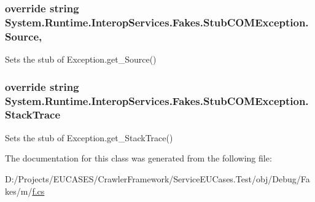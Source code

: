 \hypertarget{class_system_1_1_runtime_1_1_interop_services_1_1_fakes_1_1_stub_c_o_m_exception_a6d206a4389618e6d53ee52db095c06f0}{
\subsubsection[{Source}]{\setlength{\rightskip}{0pt plus 5cm}override string System.\-Runtime.\-Interop\-Services.\-Fakes.\-Stub\-C\-O\-M\-Exception.\-Source\hspace{0.3cm}{\ttfamily [get]}, {\ttfamily [set]}}}\label{class_system_1_1_runtime_1_1_interop_services_1_1_fakes_1_1_stub_c_o_m_exception_a6d206a4389618e6d53ee52db095c06f0}


Sets the stub of Exception.\-get\-\_\-\-Source()

\hypertarget{class_system_1_1_runtime_1_1_interop_services_1_1_fakes_1_1_stub_c_o_m_exception_a547d0dc6ad8e8085a304927a7ffe11d9}{
\subsubsection[{Stack\-Trace}]{\setlength{\rightskip}{0pt plus 5cm}override string System.\-Runtime.\-Interop\-Services.\-Fakes.\-Stub\-C\-O\-M\-Exception.\-Stack\-Trace\hspace{0.3cm}{\ttfamily [get]}}}\label{class_system_1_1_runtime_1_1_interop_services_1_1_fakes_1_1_stub_c_o_m_exception_a547d0dc6ad8e8085a304927a7ffe11d9}


Sets the stub of Exception.\-get\-\_\-\-Stack\-Trace()



The documentation for this class was generated from the following file\-:\begin{DoxyCompactItemize}
\item 
D\-:/\-Projects/\-E\-U\-C\-A\-S\-E\-S/\-Crawler\-Framework/\-Service\-E\-U\-Cases.\-Test/obj/\-Debug/\-Fakes/m/\hyperlink{m_2f_8cs}{f.\-cs}\end{DoxyCompactItemize}
